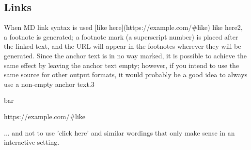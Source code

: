 \begin{multicols}{2}
\subsection{Links
}
When MD link syntax is used {\mktsStyleCode{}[like \allowbreak{}here]\allowbreak{}(https://\allowbreak{}example.com/\allowbreak{}\#like)}
like here{\mktsEnStyleMarkMain{}2}, a footnote is generated; a footnote mark
(a superscript number) is placed after the linked text, and the URL will appear in
the footnotes wherever they will be generated. Since the anchor text is in no way
marked, it is possible to achieve the same effect by leaving the anchor text
empty; however, if you intend to use the same source for other output formats,
it would probably be a good idea to always use a non-empty anchor text.{\mktsEnStyleMarkMain{}3}



\begin{mktsEnNotes}{\mktsEnStyleMarkNotes{}\mktsEnMarkAfter{}}bar

{\mktsEnStyleMarkNotes{}\mktsEnMarkAfter{}}{\mktsStyleUrl{}https:\g/\g/\g\allowbreak{}example.com\g/\g\allowbreak{}\#like

}{\mktsEnStyleMarkNotes{}\mktsEnMarkAfter{}}... and not
to use 'click here' and similar wordings that only make sense in an interactive setting.

\end{mktsEnNotes}


\end{multicols}




